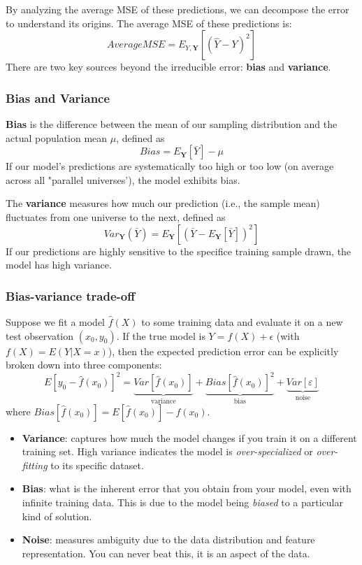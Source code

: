 By analyzing the average MSE of these predictions, we can decompose the error to understand its origins. The average MSE of these predictions is:
$$
	Average MSE = E_{Y, \bm Y}\left[\left( \hat Y - Y \right)^2 \right]
$$
There are two key sources beyond the irreducible error: \textbf{bias} and \textbf{variance}.

\subsubsection{Bias and Variance}

\textbf{Bias} is the difference between the mean of our sampling distribution and the actual population mean $\mu$, defined as
$$
	Bias = E_{\bm Y}[\bar Y] - \mu
$$
If our model's predictions are systematically too high or too low (on average across all "parallel universes'), the model exhibits bias.

The \textbf{variance} measures how much our prediction (i.e., the sample mean) fluctuates from one universe to the next, defined as
$$
	Var_{\bm Y}(\bar Y) = E_{\bm Y}\left[ \left( \bar Y - E_{\bm Y}[\bar Y] \right)^2 \right]
$$
If our predictions are highly sensitive to the specifice training sample drawn, the model has high variance.

\subsubsection{Bias-variance trade-off}

Suppose we fit a model $\hat f(X)$ to some training data and evaluate it on a new test observation $(x_0, y_0)$. If the true model is $Y = f(X) + \epsilon$ (with $f(X) = E(Y | X = x)$), then the expected prediction error can be explicitly broken down into three components:
$$
	E[y_0 - \hat f(x_0)]^2
	=
	\underbrace{Var[\hat f(x_0)]}_{\text{variance}}
	+
	\underbrace{Bias[\hat f(x_0)]^2}_{\text{bias}}
	+
	\underbrace{Var[\varepsilon]}_{\text{noise}}
$$
where $Bias[\hat f(x_0)] = E[\hat f(x_0)] - f(x_0)$.
\begin{itemize}
	\item \textbf{Variance}: captures how much the model changes if you train it on a different training set. High variance indicates the model is \textit{over-specialized} or \textit{over-fitting} to its specific dataset.
    \item \textbf{Bias}: what is the inherent error that you obtain from your model, even with infinite training data. This is due to the model being \textit{biased} to a particular kind of solution.
    \item \textbf{Noise}: measures ambiguity due to the data distribution and feature representation. You can never beat this, it is an aspect of the data.
\end{itemize}
